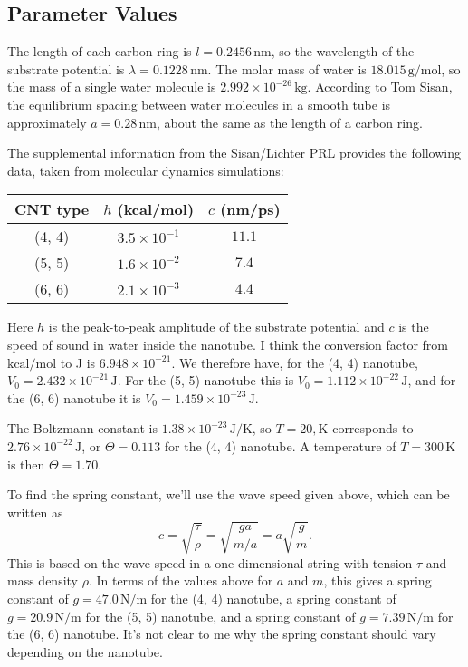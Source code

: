 \documentclass[11pt]{article}
\begin{document}
\subsection{Parameter Values}

The length of each carbon ring is $l=0.2456\,\text{nm}$, so the wavelength of the substrate potential is $\lambda=0.1228\,\text{nm}$. The molar mass of water is $18.015\,\text{g/mol}$, so the mass of a single water molecule is $2.992\times10^{-26}\,\text{kg}$. According to Tom Sisan, the equilibrium spacing between water molecules in a smooth tube is approximately $a=0.28\,\text{nm}$, about the same as the length of a carbon ring.

The supplemental information from the Sisan/Lichter PRL provides the following data, taken from molecular dynamics simulations:
\begin{center}
\begin{tabular}{ccc}
CNT type & $h$ (kcal/mol) & $c$ (nm/ps) \\\hline
(4, 4) & $3.5\times10^{-1}$ & $11.1$ \\
(5, 5) & $1.6\times10^{-2}$ & $7.4$ \\
(6, 6) & $2.1\times10^{-3}$ & $4.4$
\end{tabular}
\end{center}

Here $h$ is the peak-to-peak amplitude of the substrate potential and $c$ is the speed of sound in water inside the nanotube. I think the conversion factor from $\text{kcal}/\text{mol}$ to J is $6.948\times10^{-21}$. We therefore have, for the (4, 4) nanotube, $V_0=2.432\times10^{-21}\,\text{J}$. For the (5, 5) nanotube this is $V_0=1.112\times10^{-22}\,\text{J}$, and for the (6, 6) nanotube it is $V_0=1.459\times10^{-23}\,\text{J}$.

The Boltzmann constant is $1.38\times10^{-23}\,\text{J}/\text{K}$, so $T=20,\text{K}$ corresponds to $2.76\times10^{-22}\,\text{J}$, or $\Theta = 0.113$ for the (4, 4) nanotube. A temperature of $T=300\,\text{K}$ is then $\Theta=1.70$.

To find the spring constant, we'll use the wave speed given above, which can be written as
\[
c = \sqrt{\frac{\tau}{\rho}}=\sqrt{\frac{ga}{m/a}}=a\sqrt{\frac{g}{m}}.
\]
This is based on the wave speed in a one dimensional string with tension $\tau$ and mass density $\rho$. In terms of the values above for $a$ and $m$, this gives a spring constant of $g=47.0\,\text{N}/\text{m}$ for the (4, 4) nanotube, a spring constant of $g=20.9\,\text{N}/\text{m}$ for the (5, 5) nanotube, and a spring constant of $g=7.39\,\text{N}/\text{m}$ for the (6, 6) nanotube. It's not clear to me why the spring constant should vary depending on the nanotube.
\end{document}
